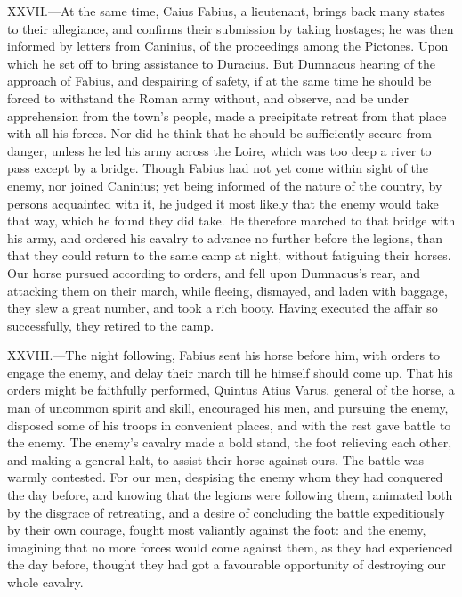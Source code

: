 XXVII.—At the same time, Caius Fabius, a lieutenant, brings back many
states to their allegiance, and confirms their submission by taking
hostages; he was then informed by letters from Caninius, of the
proceedings among the Pictones. Upon which he set off to bring
assistance to Duracius. But Dumnacus hearing of the approach of Fabius,
and despairing of safety, if at the same time he should be forced to
withstand the Roman army without, and observe, and be under apprehension
from the town's people, made a precipitate retreat from that place with
all his forces. Nor did he think that he should be sufficiently secure
from danger, unless he led his army across the Loire, which was too deep
a river to pass except by a bridge. Though Fabius had not yet come
within sight of the enemy, nor joined Caninius; yet being informed of
the nature of the country, by persons acquainted with it, he judged it
most likely that the enemy would take that way, which he found they did
take. He therefore marched to that bridge with his army, and ordered his
cavalry to advance no further before the legions, than that they could
return to the same camp at night, without fatiguing their horses. Our
horse pursued according to orders, and fell upon Dumnacus's rear, and
attacking them on their march, while fleeing, dismayed, and laden with
baggage, they slew a great number, and took a rich booty. Having
executed the affair so successfully, they retired to the camp.

XXVIII.—The night following, Fabius sent his horse before him, with
orders to engage the enemy, and delay their march till he himself should
come up. That his orders might be faithfully performed, Quintus Atius
Varus, general of the horse, a man of uncommon spirit and skill,
encouraged his men, and pursuing the enemy, disposed some of his troops
in convenient places, and with the rest gave battle to the enemy. The
enemy's cavalry made a bold stand, the foot relieving each other, and
making a general halt, to assist their horse against ours. The battle
was warmly contested. For our men, despising the enemy whom they had
conquered the day before, and knowing that the legions were following
them, animated both by the disgrace of retreating, and a desire of
concluding the battle expeditiously by their own courage, fought most
valiantly against the foot: and the enemy, imagining that no more forces
would come against them, as they had experienced the day before, thought
they had got a favourable opportunity of destroying our whole cavalry.

